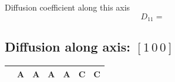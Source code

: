 \documentclass[a4paper, 11pt]{article}
\begin{document}
\normalsize
Diffusion coefficient along this axis\\
		\begin{equation*}
			D_{11} = 
		\end{equation*}

\subsection{Diffusion along axis: $\left[		1 		\, 0 		\, 0 \right]$}

\clearpage
\begin{landscape}

\footnotesize
\renewcommand{\arraystretch}{1.8}
\begin{table}[htpb]
	\begin{tabularx}{\linewidth}{ p{15pt} | >{\raggedright\arraybackslash}X  >{\raggedright\arraybackslash}X  >{\raggedright\arraybackslash}X  >{\raggedright\arraybackslash}X  >{\raggedright\arraybackslash}X  >{\raggedright\arraybackslash}X }
		\toprule
   &  A &  A &  A &  A &  C &  C\\ \midrule


\end{tabularx}
\end{table}
\end{landscape}
\end{document}
